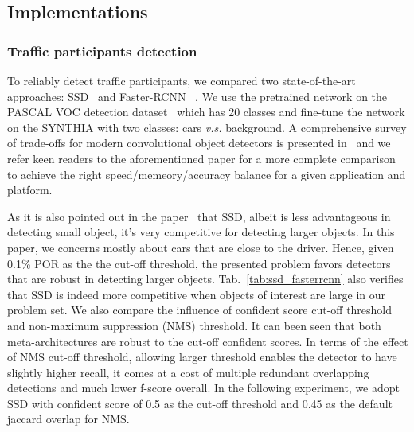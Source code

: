 \documentclass[10pt,twocolumn,letterpaper]{article}
\newcommand{\ra}[1]{\renewcommand{\arraystretch}{#1}}
\begin{document}
%
\subsection{Implementations}\label{sec:Implementations}


\subsubsection{Traffic participants detection}

To reliably detect traffic participants, we compared two state-of-the-art approaches: SSD~\cite{liu2016ssd} and Faster-RCNN ~\cite{ren2015faster_nips}.
We use the pretrained network on the PASCAL VOC detection dataset~\cite{everingham2015pascal} which has 20 classes and fine-tune the network on the SYNTHIA with two classes: cars \emph{v.s.} background.
A comprehensive survey of trade-offs for modern convolutional object detectors is presented in~\cite{huang2017speed} and we refer keen readers to the aforementioned paper for a more complete comparison to achieve the right speed/memeory/accuracy balance for a given application and platform.

As it is also pointed out in the paper~\cite{huang2017speed} that SSD, albeit is less advantageous in detecting small object, it's very competitive for detecting larger objects. In this paper, we concerns mostly about cars that are close to the driver. Hence, given 0.1\% POR as the the cut-off threshold, the presented problem favors detectors that are robust in detecting larger objects.
Tab.~\ref{tab:ssd_fasterrcnn} also verifies that SSD is indeed more competitive when objects of interest are large in our problem set. We also compare the influence of confident score cut-off threshold and non-maximum suppression (NMS) threshold. It can been seen that both meta-architectures are robust to the cut-off confident scores.
In terms of the effect of NMS cut-off threshold, allowing larger threshold enables the detector to have slightly higher recall, it comes at a cost of multiple redundant overlapping detections and much lower f-score overall. In the following experiment, we adopt SSD with confident score of 0.5 as the cut-off threshold and 0.45 as the default jaccard overlap for NMS.
\end{document}
